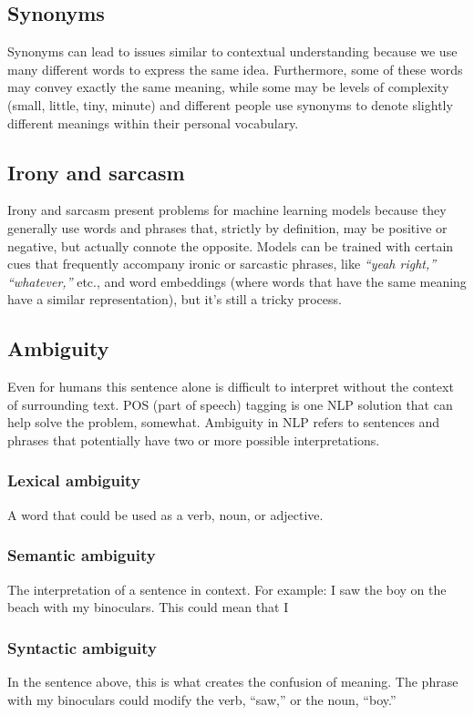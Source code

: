 \documentclass[11pt]{article}
\begin{document}
\subsection{Synonyms}
\label{sec:org1135397}
Synonyms can lead to issues similar to contextual understanding because we use
many different words to express the same idea. Furthermore, some of these words
may convey exactly the same meaning, while some may be levels of complexity
(small, little, tiny, minute) and different people use synonyms to denote slightly
different meanings within their personal vocabulary.
\subsection{Irony and sarcasm}
\label{sec:org04cf4dc}
Irony and sarcasm present problems for machine learning models because they generally
use words and phrases that, strictly by definition, may be positive or negative, but
actually connote the opposite.
Models can be trained with certain cues that frequently accompany ironic or sarcastic
phrases, like \emph{“yeah right,” “whatever,”} etc., and word embeddings (where words that
have the same meaning have a similar representation), but it’s still a tricky process.
\subsection{Ambiguity}
\label{sec:orge230c42}
Even for humans this sentence alone is difficult to interpret without
the context of surrounding text. POS (part of speech) tagging is one NLP solution
that can help solve the problem, somewhat.
Ambiguity in NLP refers to sentences and phrases that potentially have two or more
possible interpretations.

\subsubsection{Lexical ambiguity}
\label{sec:orgf0de735}
A word that could be used as a verb, noun, or adjective.
\subsubsection{Semantic ambiguity}
\label{sec:orgd5bf21a}
The interpretation of a sentence in context. For example: I saw the boy on the
beach with my binoculars. This could mean that I
\subsubsection{Syntactic ambiguity}
\label{sec:orgeb51822}
In the sentence above, this is what creates the confusion of meaning.
The phrase with my binoculars could modify the verb, “saw,” or the noun, “boy.”
\end{document}
